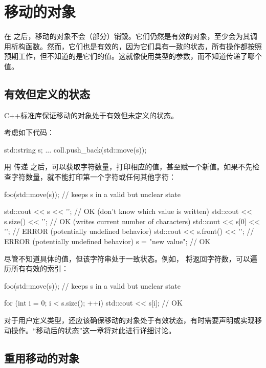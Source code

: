 \section{移动的对象}
在  之后，移动的对象不会（部分）销毁。它们仍然是有效的对象，至少会为其调用析构函数。然而，它们也是有效的，因为它们具有一致的状态，所有操作都按照预期工作，但不知道的是它们的值。这就像使用类型的参数，而不知道传递了哪个值。

\subsection{有效但定义的状态}

C++标准库保证移动的对象处于有效但未定义的状态。

考虑如下代码：

\begin{cppcode}
std::string s;
...
coll.push_back(std::move(s));
\end{cppcode}

用  传递  之后，可以获取字符数量，打印相应的值，甚至赋一个新值。如果不先检查字符数量，就不能打印第一个字符或任何其他字符：

\begin{cppcode}
foo(std::move(s)); // keeps s in a valid but unclear state

std::cout << s << '\n'; // OK (don’t know which value is written)
std::cout << s.size() << '\n'; // OK (writes current number of characters)
std::cout << s[0] << '\n'; // ERROR (potentially undefined behavior)
std::cout << s.front() << '\n'; // ERROR (potentially undefined behavior)
s = "new value"; // OK
\end{cppcode}

尽管不知道具体的值，但该字符串处于一致状态。例如， 将返回字符数，可以遍历所有有效的索引：

\begin{cppcode}
foo(std::move(s)); // keeps s in a valid but unclear state

for (int i = 0; i < s.size(); ++i) {
	std::cout << s[i]; // OK
}
\end{cppcode}

对于用户定义类型，还应该确保移动的对象处于有效状态，有时需要声明或实现移动操作。“移动后的状态”这一章将对此进行详细讨论。

\subsection{重用移动的对象}

